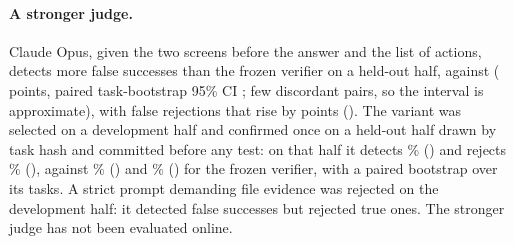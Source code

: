 
\paragraph{A stronger judge.} Claude Opus, given the two screens before the answer and the list of actions, detects more false successes than the frozen verifier on a held-out half, \gvTwoDet{} against \gvOneDet{} (\gvDetDiff{} points, paired task-bootstrap 95\% CI \gvDetDiffCi; few discordant pairs, so the interval is approximate), with false rejections that rise by \gvRejDiff{} points (\gvRejDiffCi). The variant was selected on a development half and confirmed once on a held-out half drawn by task hash and committed before any test: on that half it detects \gvTwoDetPct\% (\gvTwoDet) and rejects \gvTwoRejPct\% (\gvTwoRej), against \gvOneDetPct\% (\gvOneDet) and \gvOneRejPct\% (\gvOneRej) for the frozen verifier, with a paired bootstrap over its \gvTasks{} tasks. A strict prompt demanding file evidence was rejected on the development half: it detected \gvStrictDet{} false successes but rejected \gvStrictRej{} true ones. The stronger judge has not been evaluated online. %

